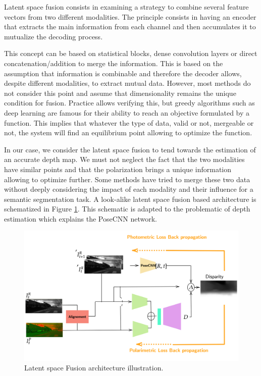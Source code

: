 Latent space fusion consists in examining a strategy to combine several feature vectors from two different modalities.
The principle consists in having an encoder that extracts the main information from each channel and then accumulates it to mutualize the decoding process.


This concept can be based on statistical blocks, dense convolution layers or direct concatenation/addition to merge the information.
This is based on the assumption that information is combinable and therefore the decoder allows, despite different modalities, to extract mutual data.
However, most methods do not consider this point and assume that dimensionality remains the unique condition for fusion. Practice allows verifying this, but greedy algorithms such as deep learning are famous for their ability to reach an objective formulated by a function. This implies that whatever the type of data, valid or not, mergeable or not, the system will find an equilibrium point allowing to optimize the function. 

In our case, we consider the latent space fusion to tend towards the estimation of an accurate depth map. We must not neglect the fact that the two modalities have similar points and that the polarization brings a unique information allowing to optimize further. Some methods \cite{rashed2019motion,el2019rgb} have tried to merge these two data without deeply considering the impact of each modality and their influence for a semantic segmentation task.
A look-alike latent space fusion based architecture is schematized in Figure \ref{fig:latents}. This schematic is adapted to the problematic of depth estimation which explains the PoseCNN network.

\begin{figure}[h]
	\centering
	\includegraphics[width=0.8\linewidth]{Figures/Fusion/latents}
	\caption[Latent space Fusion architecture illustration.]{Latent space Fusion architecture illustration.}
	\label{fig:latents}
\end{figure}


